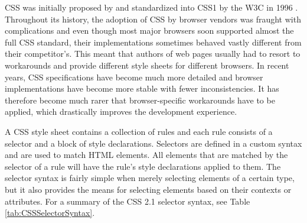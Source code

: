 CSS was initially proposed by \cite{CSSProposal} and standardized into
CSS1 by the W3C in 1996 \parencite{CSS1}. Throughout its history, the
adoption of CSS by browser vendors was fraught with complications and
even though most major browsers soon supported almost the full CSS
standard, their implementations sometimes behaved vastly different
from their competitor's. This meant that authors of web pages usually
had to resort to workarounds and provide different style sheets for
different browsers. In recent years, CSS specifications have become
much more detailed \parencite{CSS21} and browser implementations have
become more stable with fewer inconsistencies. It has therefore become
much rarer that browser-specific workarounds have to be applied, which
drastically improves the development experience.

A CSS style sheet contains a collection of rules and each rule
consists of a selector and a block of style declarations. Selectors
are defined in a custom syntax and are used to match HTML
elements. All elements that are matched by the selector of a rule will
have the rule's style declarations applied to them. The selector
syntax is fairly simple when merely selecting elements of a certain
type, but it also provides the means for selecting elements based on
their contexts or attributes. For a summary of the CSS 2.1 selector
syntax, see Table \ref{tab:CSSSelectorSyntax}.








